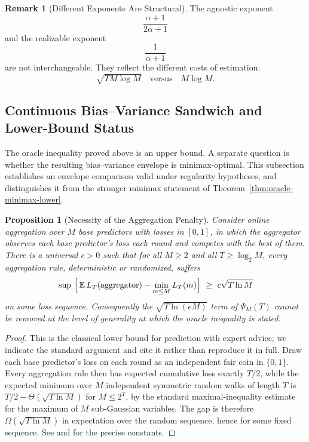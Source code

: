 \documentclass[12pt]{article}
\newtheorem{proposition}[theorem]{Proposition}
\theoremstyle{definition}
\newtheorem{remark}[theorem]{Remark}
\newcommand{\PsiAgg}{\Psi}
\begin{document}
\begin{remark}[Different Exponents Are Structural]
\label{rem:exponents-structural}
The agnostic exponent
\[
\frac{\alpha+1}{2\alpha+1}
\]
and the realizable exponent
\[
\frac{1}{\alpha+1}
\]
are not interchangeable.  They reflect the different costs of estimation:
\[
\sqrt{T M\log M}
\quad\text{versus}\quad
M\log M.
\]
\end{remark}

\subsection{Continuous Bias--Variance Sandwich and Lower-Bound Status}
\label{subsec:oracle-sandwich}

The oracle inequality proved above is an upper bound.  A separate question is
whether the resulting bias--variance envelope is minimax-optimal.  This
subsection establishes an envelope comparison valid under regularity
hypotheses, and distinguishes it from the stronger minimax statement of
Theorem~\ref{thm:oracle-minimax-lower}.

\begin{proposition}[Necessity of the Aggregation Penalty]
\label{prop:aggregation-necessary}
Consider online aggregation over $M$ base predictors with losses in $[0,1]$,
in which the aggregator observes each base predictor's loss each round and
competes with the best of them.  There is a universal $c>0$ such that for all
$M\ge2$ and all $T\ge\log_2M$, every aggregation rule, deterministic or
randomized, suffers
\[
\sup\ \Bigl[\,\mathbb E\,L_T(\text{aggregator})-\min_{m\le M}L_T(m)\Bigr]
\ \ge\
c\sqrt{T\ln M}
\]
on some loss sequence.  Consequently the $\sqrt{T\ln(eM)}$ term of
$\PsiAgg_M(T)$ cannot be removed at the level of generality at which the
oracle inequality is stated.
\end{proposition}

\begin{proof}
This is the classical lower bound for prediction with expert advice; we
indicate the standard argument and cite it rather than reproduce it in full.
Draw each base predictor's loss on each round as an independent fair coin in
$\{0,1\}$.  Every aggregation rule then has expected cumulative loss exactly
$T/2$, while the expected minimum over $M$ independent symmetric random walks
of length $T$ is $T/2-\Theta(\sqrt{T\ln M})$ for $M\le2^{T}$, by the standard
maximal-inequality estimate for the maximum of $M$ sub-Gaussian variables.
The gap is therefore $\Omega(\sqrt{T\ln M})$ in expectation over the random
sequence, hence for some fixed sequence.  See
\cite[Thm.~3.7]{cesabianchi2006} and \cite[Ch.~2]{boucheron2013} for the
precise constants.
\end{proof}
\end{document}
